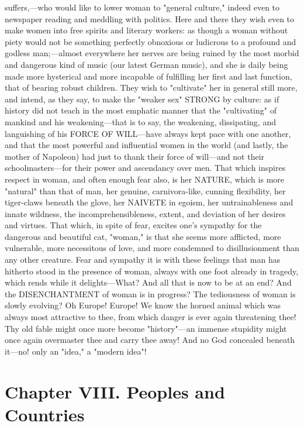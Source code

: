 \documentclass[12pt]{article}
\begin{document}
suffers,---who would like to lower woman to "general culture," indeed even to newspaper reading and meddling with politics. Here and there they wish even to make women into free spirits and literary workers: as though a woman without piety would not be something perfectly obnoxious or ludicrous to a profound and godless man;---almost everywhere her nerves are being ruined by the most morbid and dangerous kind of music (our latest German music), and she is daily being made more hysterical and more incapable of fulfilling her first and last function, that of bearing robust children. They wish to "cultivate" her in general still more, and intend, as they say, to make the "weaker sex" STRONG by culture: as if history did not teach in the most emphatic manner that the "cultivating" of mankind and his weakening---that is to say, the weakening, dissipating, and languishing of his FORCE OF WILL---have always kept pace with one another, and that the most powerful and influential women in the world (and lastly, the mother of Napoleon) had just to thank their force of will---and not their schoolmasters---for their power and ascendancy over men. That which inspires respect in woman, and often enough fear also, is her NATURE, which is more "natural" than that of man, her genuine, carnivora-like, cunning flexibility, her tiger-claws beneath the glove, her NAIVETE in egoism, her untrainableness and innate wildness, the incomprehensibleness, extent, and deviation of her desires and virtues. That which, in spite of fear, excites one's sympathy for the dangerous and beautiful cat, "woman," is that she seems more afflicted, more vulnerable, more necessitous of love, and more condemned to disillusionment than any other creature. Fear and sympathy it is with these feelings that man has hitherto stood in the presence of woman, always with one foot already in tragedy, which rends while it delights---What? And all that is now to be at an end? And the DISENCHANTMENT of woman is in progress? The tediousness of woman is slowly evolving? Oh Europe! Europe! We know the horned animal which was always most attractive to thee, from which danger is ever again threatening thee! Thy old fable might once more become "history"---an immense stupidity might once again overmaster thee and carry thee away! And no God concealed beneath it---no! only an "idea," a "modern idea"!

\section*{Chapter VIII. Peoples and Countries}
\end{document}
